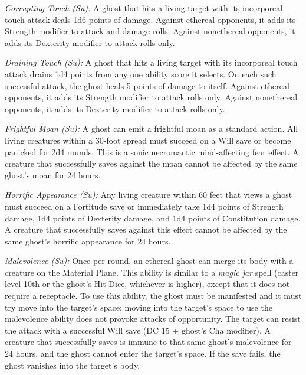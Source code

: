 \documentclass{article}
\begin{document}
\textit{Corrupting Touch (Su): }A ghost that hits a living target with its incorporeal 
touch attack deals 1d6 points of damage. Against ethereal opponents, it adds its 
Strength modifier to attack and damage rolls. Against nonethereal opponents, it 
adds its Dexterity modifier to attack rolls only.

\textit{Draining Touch (Su): }A ghost that hits a living target with its incorporeal 
touch attack drains 1d4 points from any one ability score it selects. On each such 
successful attack, the ghost heals 5 points of damage to itself. Against ethereal 
opponents, it adds its Strength modifier to attack rolls only. Against nonethereal 
opponents, it adds its Dexterity modifier to attack rolls only.

\textit{Frightful Moan (Su): }A ghost can emit a frightful moan as a standard action. 
All living creatures within a 30-foot spread must succeed on a Will save or become 
panicked for 2d4 rounds. This is a sonic necromantic mind-affecting fear effect. 
A creature that successfully saves against the moan cannot be affected by the same 
ghost's moan for 24 hours.

\textit{Horrific Appearance (Su): }Any living creature within 60 feet that views 
a ghost must succeed on a Fortitude save or immediately take 1d4 points of Strength 
damage, 1d4 points of Dexterity damage, and 1d4 points of Constitution damage. 
A creature that successfully saves against this effect cannot be affected by the 
same ghost's horrific appearance for 24 hours.

\textit{Malevolence (Su): }Once per round, an ethereal ghost can merge its body 
with a creature on the Material Plane. This ability is similar to a \textit{magic 
jar }spell (caster level 10th or the ghost's Hit Dice, whichever is higher), except 
that it does not require a receptacle. To use this ability, the ghost must be manifested 
and it must try move into the target's space; moving into the target's space to 
use the malevolence ability does not provoke attacks of opportunity. The target 
can resist the attack with a successful Will save (DC 15 + ghost's Cha modifier). 
A creature that successfully saves is immune to that same ghost's malevolence for 
24 hours, and the ghost cannot enter the target's space. If the save fails, the 
ghost vanishes into the target's body.
\end{document}
